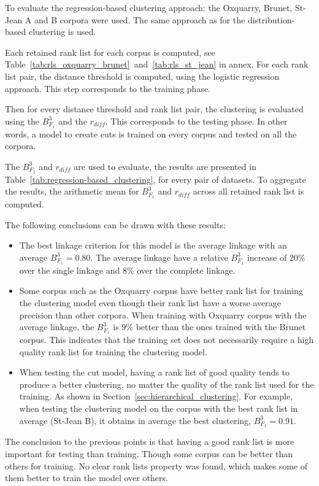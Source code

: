 To evaluate the regression-based clustering approach: the Oxquarry, Brunet, St-Jean A and B corpora were used.
The same approach as for the distribution-based clustering is used.

Each retained rank list for each corpus is computed, see Table~\ref{tab:rls_oxquarry_brunet}~and~\ref{tab:rls_st_jean} in annex.
For each rank list pair, the distance threshold is computed, using the logistic regression approach.
This step corresponds to the training phase.

Then for every distance threshold and rank list pair, the clustering is evaluated using the $B^3_{F_1}$ and the $r_{diff}$.
This corresponds to the testing phase.
In other words, a model to create cuts is trained on every corpus and tested on all the corpora.

The $B^3_{F_1}$ and $r_{diff}$ are used to evaluate, the results are presented in Table~\ref{tab:regression-based_clustering}, for every pair of datasets.
To aggregate the results, the arithmetic mean for $B^3_{F_1}$ and $r_{diff}$ across all retained rank list is computed.

The following conclusions can be drawn with these results:
\begin{itemize}
  \item
  The best linkage criterion for this model is the average linkage with an average $B^3_{F_1} = 0.80$.
  The average linkage have a relative $B^3_{F_1}$ increase of $20\%$ over the single linkage and $8\%$ over the complete linkage.
  \item
  Some corpus such as the Oxquarry corpus have better rank list for training the clustering model even though their rank list have a worse average precision than other corpora.
  When training with Oxquarry corpus with the average linkage, the $B^3_{F_1}$ is $9\%$ better than the ones trained with the Brunet corpus.
  This indicates that the training set does not necessarily require a high quality rank list for training the clustering model.
  \item
  When testing the cut model, having a rank list of good quality tends to produce a better clustering, no matter the quality of the rank list used for the training.
  As shown in Section~\ref{sec:hierarchical_clustering}.
  For example, when testing the clustering model on the corpus with the best rank list in average (St-Jean B), it obtains in average the best clustering, $B^3_{F_1} = 0.91$.
\end{itemize}

The conclusion to the previous points is that having a good rank list is more important for testing than training.
Though some corpus can be better than others for training.
No clear rank lists property was found, which makes some of them better to train the model over others.


